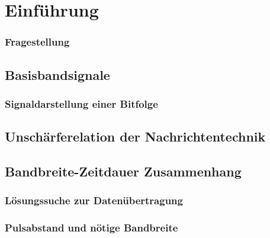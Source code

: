\section{Einführung}
\subsubsection*{Fragestellung}

\subsection{Basisbandsignale}

\subsubsection{Signaldarstellung einer Bitfolge}

\subsection{Unschärferelation der Nachrichtentechnik}

\subsection{Bandbreite-Zeitdauer Zusammenhang}
\subsubsection{Lösungssuche zur Datenübertragung}
\subsubsection{Pulsabstand und nötige Bandbreite}

